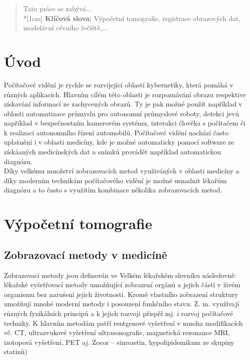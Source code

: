 \documentclass{thesis}%
\begin{document}
\begin{abstract}
Tato práce se zabývá...\\*[1cm]
\textbf{Klíčová slova:} Výpočetní tomografie, registrace obrazových dat, modelávní cévního řečiště,...


\end{abstract}

\tableofcontents
\newpage
\setcounter{page}{1}
\chapter{Úvod}
Počítačové vidění je rychle se rozvíjející oblastí kybernetiky, která pomáhá v různých aplikacích. Hlavním cílém této oblasti je rozpoznávání obrazu respektive získavání informací ze zachycených obrazů.
Ty je pak možné použít například v oblasti automatizace průmyslu pro autonomní průmyslové roboty, detekci jevů například v bezpečnostním kamerovém systému, interakci člověka s počítačem či k realizaci
autonomního řízení automobilů. Počítačové vidění nachází často uplatnění i v oblasti medicíny, kde je možné automaticky pomocí software ze získáaných medicínských dat a snímků provádět například automatickou
diagnózu.\\
Díky velkému množství zobrazovacích metod využiváných v oblasti medicíny a díky moderním technikám počítačového vidění je možné usnadnit lékařům diagnózu a to často s využitím kombinace několika
zobrazovacích metod.\\

\chapter{Výpočetní tomografie}
\section{Zobrazovací metody v medicíně}
Zobrazovací metody jsou definován ve Velkém lékařském slovníku následovně:
lékařské vyšetřovací metody umožňující zobrazení orgánů a jejich částí v živém organismu bez narušení jejich životnosti. Kromě vlastního zobrazení struktury umožňují mnohé moderní metody i posouzení funkčního stavu. Z. m. využívají různých fyzikálních principů a k jejich rozvoji přispěl mj. i rozvoj počítačové techniky. K hlavním metodám patří rentgenové vyšetření v mnoha modifikacích vč. CT, ultrazvukové vyšetření ultrasonografie, magnetická rezonance MRI, izotopová vyšetření, PET aj. Zocor – simvastin, hypolipidemikum ze skupiny statinů)\cite{hugo}\\
\end{document}
